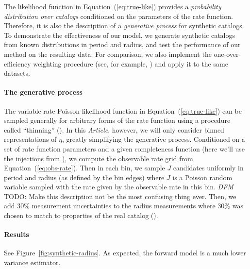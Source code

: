 \documentclass[12pt,preprint]{aastex}
\newcommand{\paper}{\emph{Article}}
\newcommand{\Fig}[1]{Figure~\ref{fig:#1}}
\newcommand{\fig}[1]{\Fig{#1}}
\newcommand{\Eq}[1]{Equation~(\ref{eq:#1})}
\newcommand{\eq}[1]{\Eq{#1}}
\newcommand{\todo}[3]{{\color{#2} \emph{#1} TODO: #3}}
\newcommand{\dfmtodo}[1]{\todo{DFM}{red}{#1}}
\newcommand{\rate}{\ensuremath{\eta}}
\begin{document}
The likelihood function in \eq{true-like} provides a \emph{probability
distribution over catalogs} conditioned on the parameters of the rate
function.
Therefore, it is also the description of a \emph{generative process} for
synthetic catalogs.
To demonstrate the effectiveness of our model, we generate synthetic catalogs
from known distributions in period and radius, and test the performance of our
method on the resulting data.
For comparison, we also implement the one-over-efficiency weighting procedure
(see, for example, \citealt{howard, dressing, petigura}) and apply it to the
same datasets.

\paragraph{The generative process}
The variable rate Poisson likelihood function in \eq{true-like} can be sampled
generally for arbitrary forms of the rate function using a procedure called
``thinning'' (\citealt{poisson}).
In this \paper, however, we will only consider binned representations of
\rate, greatly simplifying the generative process.
Conditioned on a set of rate function parameters and a given completeness
function (here we'll use the injections from \citealt{petigura}), we compute
the observable rate grid from \eq{obs-rate}.
Then in each bin, we sample $J$ candidates uniformly in period and
radius (as defined by the bin edges) where $J$ is a Poisson random variable
sampled with the rate given by the observable rate in this bin.
\dfmtodo{Make this description not be the most confusing thing ever.}
Then, we add 30\% measurement uncertainties to the radius measurements where
30\% was chosen to match to properties of the real catalog
(\citealt{petigura}).

\paragraph{Results}
See \fig{synthetic-radius}.
As expected, the forward model is a much lower variance estimator.
\end{document}
